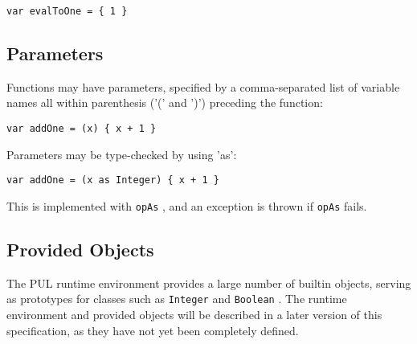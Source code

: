 \begin{verbatim}
var evalToOne = { 1 }
\end{verbatim}



\subsection{Parameters}

Functions may have parameters, specified by a comma-separated list of variable names all within parenthesis ('(' and ')') preceding the function:

\begin{verbatim}
var addOne = (x) { x + 1 }
\end{verbatim}



Parameters may be type-checked by using 'as':

\begin{verbatim}
var addOne = (x as Integer) { x + 1 }
\end{verbatim}

This is implemented with \texttt{opAs} , and an exception is thrown if \texttt{opAs} fails.



\subsection{Provided Objects}

The PUL runtime environment provides a large number of builtin objects, serving as prototypes for classes such as \texttt{Integer} and \texttt{Boolean} . The runtime environment and provided objects will be described in a later version of this specification, as they have not yet been completely defined.
